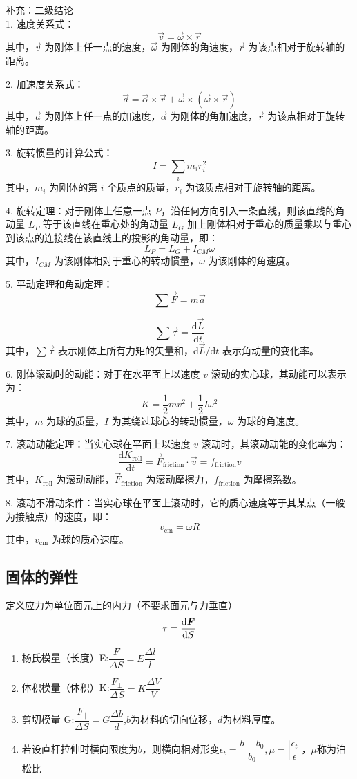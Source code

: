 补充：二级结论\\

1. 速度关系式：$$ \vec{v}=\vec{\omega}\times \vec{r} $$ 其中，$\vec{v}$ 为刚体上任一点的速度，$\vec{\omega}$ 为刚体的角速度，$\vec{r}$ 为该点相对于旋转轴的距离。

2. 加速度关系式：$$ \vec{a}=\vec{\alpha} \times \vec{r}+\vec{\omega}\times(\vec{\omega}\times\vec{r}) $$ 其中，$\vec{a}$ 为刚体上任一点的加速度，$\vec{\alpha}$ 为刚体的角加速度，$\vec{r}$ 为该点相对于旋转轴的距离。

3. 旋转惯量的计算公式：$$ I=\sum_i m_i r_i^2 $$ 其中，$m_i$ 为刚体的第 $i$ 个质点的质量，$r_i$ 为该质点相对于旋转轴的距离。

4. 旋转定理：对于刚体上任意一点 $P$，沿任何方向引入一条直线，则该直线的角动量 $L_P$ 等于该直线在重心处的角动量 $L_G$ 加上刚体相对于重心的质量乘以与重心到该点的连接线在该直线上的投影的角动量，即：$$ L_P = L_G + I_{CM}\omega $$ 其中，$I_{CM}$ 为该刚体相对于重心的转动惯量，$\omega$ 为该刚体的角速度。

5. 平动定理和角动定理：$$ \sum \vec{F} = m\vec{a} $$

$$ \sum \vec{\tau} = \frac{\mathrm{d}\vec{L}}{\mathrm{d}t} $$ 其中，$\sum \vec{\tau}$ 表示刚体上所有力矩的矢量和，$\mathrm{d}\vec{L}/\mathrm{d}t$ 表示角动量的变化率。

6. 刚体滚动时的动能：对于在水平面上以速度 $v$ 滚动的实心球，其动能可以表示为：$$ K = \frac{1}{2}mv^2 + \frac{1}{2}I\omega^2 $$ 其中，$m$ 为球的质量，$I$ 为其绕过球心的转动惯量，$\omega$ 为球的角速度。

7. 滚动动能定理：当实心球在平面上以速度 $v$ 滚动时，其滚动动能的变化率为：$$ \frac{\mathrm{d}K_{\text{roll}}}{\mathrm{d}t} = \vec{F}_{\text{friction}}\cdot\vec{v} = f_{\text{friction}}v $$ 其中，$K_{\text{roll}}$ 为滚动动能，$\vec{F}_{\text{friction}}$ 为滚动摩擦力，$f_{\text{friction}}$ 为摩擦系数。

8. 滚动不滑动条件：当实心球在平面上滚动时，它的质心速度等于其某点（一般为接触点）的速度，即：$$ v_{\text{cm}} = \omega R $$ 其中，$v_{\text{cm}}$ 为球的质心速度。
\subsection{固体的弹性}
定义应力为单位面元上的内力（不要求面元与力垂直）
\begin{equation}\label{key}
	\tau=\dfrac{\mathrm{d}\bm{F}}{\mathrm{d} S}
\end{equation}
\begin{enumerate}
	\item 杨氏模量（长度）E:$ \dfrac{F}{\Delta S}=E\dfrac{\Delta l}{l} $
	\item 体积模量（体积）K:$ \dfrac{F_\perp}{\Delta S}=K\dfrac{\Delta V}{V} $
	\item 剪切模量 G:$ \dfrac{F_\parallel}{\Delta S}=G\dfrac{\Delta b}{d} $,$ b $为材料的切向位移，$ d $为材料厚度。
	\item 若设直杆拉伸时横向限度为$b$，则横向相对形变$ \epsilon_t=\dfrac{b-b_0}{b_0},\mu =|\dfrac{\epsilon_t}{\epsilon}| $，$ \mu $称为泊松比
\end{enumerate}
